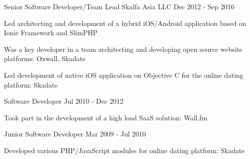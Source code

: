 \begin{cventries}
  \cventry
    {Senior Software Developer/Team Lead} %
    {Skalfa Asia LLC} %
    {} %
    {Dec 2012 - Sep 2016} %
    {
      \begin{cvitems}
        \item Led architecting and development of a hybrid iOS/Android application based on Ionic Framework and SlimPHP
        \item Was a key developer in a team architecting and developing open source website platforms: Oxwall, Skadate
        \item Led development of native iOS application on Objective C for the online dating platform: Skadate
      \end{cvitems}
    }

  \cventry
    {Software Developer} %
    {} %
    {} %
    {Jul 2010 - Dec 2012} %
    {
      \begin{cvitems}
        \item Took part in the development of a high load SaaS solution: Wall.fm
      \end{cvitems}
    }

  \cventry
    {Junior Software Developer} %
    {} %
    {} %
    {Mar 2009 - Jul 2010} %
    {
      \begin{cvitems}
        \item Developed various PHP/JavaScript modules for online dating platform: Skadate
      \end{cvitems}
    }

\end{cventries}
